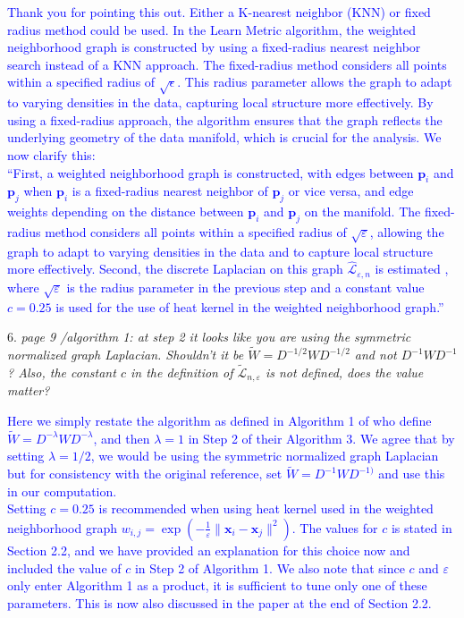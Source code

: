 \documentclass{article}
\begin{document}
   \textcolor{blue}{
   Thank you for pointing this out. Either a K-nearest neighbor (KNN) or fixed radius method could be used. In the Learn Metric algorithm, the weighted neighborhood graph is constructed by using a fixed-radius nearest neighbor search instead of a KNN approach. The fixed-radius method considers all points within a specified radius of \(\sqrt{\epsilon}\). This radius parameter allows the graph to adapt to varying densities in the data, capturing local structure more effectively. By using a fixed-radius approach, the algorithm ensures that the graph reflects the underlying geometry of the data manifold, which is crucial for the analysis. We now clarify this: \\
   ``First, a weighted neighborhood graph is constructed, with edges between \(\bm{p}_i\) and \(\bm{p}_j\) when \(\bm{p}_i\) is a fixed-radius nearest neighbor of \(\bm{p}_j\) or vice versa, and edge weights depending on the distance between \(\bm{p}_i\) and \(\bm{p}_j\) on the manifold. The fixed-radius method considers all points within a specified radius of \(\sqrt{\varepsilon}\), allowing the graph to adapt to varying densities in the data and to capture local structure more effectively. Second, the discrete Laplacian on this graph \(\hat{\mathcal{L}}_{\varepsilon,n}\) is estimated \autocite{Zhou2011-za}, where \(\sqrt{\varepsilon}\) is the radius parameter in the previous step and a constant value $c=0.25$ is used for the use of heat kernel in the weighted neighborhood graph.''
   }

6. \textit{page 9 /algorithm 1: at step 2 it looks like you are using the symmetric normalized graph Laplacian. Shouldn't it be \(\tilde{W}=D^{-1 / 2} W D^{-1 / 2}\) and not \(D^{-1} W D^{-1}\)? Also, the constant \(c\) in the definition of \(\tilde{\mathcal{L}}_{n, \varepsilon}\) is not defined, does the value matter?}

   \textcolor{blue}{Here we simply restate the algorithm as defined in Algorithm 1 of \cite{Perrault-Joncas2013-pq} who define \(\tilde{W}=D^{-\lambda} W D^{- \lambda}\), and then $\lambda=1$ in Step 2 of their Algorithm 3. We agree that by setting $\lambda=1/2$, we would be using the symmetric normalized graph Laplacian but for consistency with the original reference, set \(\tilde{W}=D^{-1} W D^{-1)} \) and use this in our computation. \\
   Setting \(c=0.25\) is recommended when using heat kernel used in the weighted neighborhood graph $w_{i,j}=\exp(-\frac{1}{\varepsilon}\|\bm{x}_i-\bm{x}_j\|^2)$. The values for \(c\) is stated in Section 2.2, and we have provided an explanation for this choice now and included the value of \(c\) in Step 2 of Algorithm 1. We also note that since \(c\) and ${\varepsilon}$ only enter Algorithm 1 as a product, it is sufficient to tune only one of these parameters. This is now also discussed in the paper at the end of Section 2.2.
   }
\end{document}
